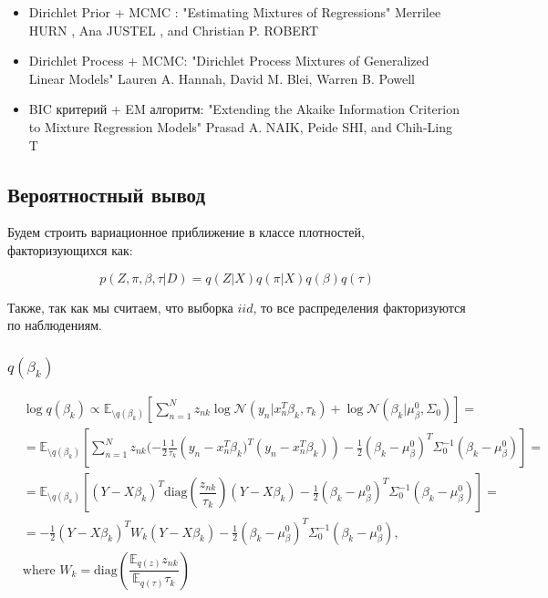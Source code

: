 \begin{itemize}
\item Dirichlet Prior + MCMC : "Estimating Mixtures of Regressions" Merrilee HURN , Ana JUSTEL , and Christian P. ROBERT~\cite{mix_one}
\item Dirichlet Process + MCMC: "Dirichlet Process Mixtures of Generalized Linear Models" Lauren A. Hannah, David M. Blei, Warren B. Powell~\cite{mix_two}
\item BIC критерий + EM алгоритм: "Extending the Akaike Information Criterion to Mixture Regression Models" Prasad A. NAIK, Peide SHI, and Chih-Ling T~\cite{mix_three}
 \end{itemize}

\subsection{Вероятностный вывод}
Будем строить вариационное приближение в классе плотностей, факторизующихся как:

$$
p(Z, \pi, \beta, \tau|D) = q(Z|X)q(\pi|X)q(\beta)q(\tau)
$$

Также, так как мы считаем, что выборка $iid$, то все распределения факторизуются по наблюдениям.

\subsubsection*{$q(\beta_k)$}

\begin{equation*}
\begin{aligned}
& \log q(\beta_k) \propto \mathbb{E}_{\setminus q(\beta_k)}\left[\sum\limits_{n=1}^N z_{nk}\log\mathcal{N}(y_n|x_n^T\beta_k,\tau_k)+\log\mathcal{N}(\beta_k|\mu_{\beta}^0, 
\Sigma_0)\right] = \\
& =  \mathbb{E}_{\setminus q(\beta_k)}\left[\sum\limits_{n=1}^N z_{nk}(-\frac{1}{2}\frac{1}{\tau_k}\left(y_n - x_n^T\beta_k)^T(y_n - x_n^T\beta_k)\right)-\frac{1}{2}(\beta_k - \mu_{\beta}^0)^T\Sigma_0^{-1}(\beta_k - \mu_{\beta}^0)\right] = \\
&  = \mathbb{E}_{\setminus q(\beta_k)}\left[(Y-X\beta_k)^T\text{diag}(\dfrac{z_{nk}}{\tau_k})(Y-X\beta_k) - \frac{1}{2}(\beta_k - \mu_{\beta}^0)^T\Sigma_0^{-1}(\beta_k - \mu_{\beta}^0)\right] = \\
& = -\frac{1}{2}(Y - X\beta_k)^T W_k (Y-X\beta_k) - \frac{1}{2}(\beta_k - \mu_{\beta}^0)^T\Sigma^{-1}_0(\beta_k - \mu_{\beta}^0), \\
& \text{where }W_k = \text{diag}\left(\dfrac{\mathbb{E}_{q(z)} z_{nk}}{\mathbb{E}_{q(\tau)}\tau_k}\right)
 \end{aligned}
 \end{equation*}  

